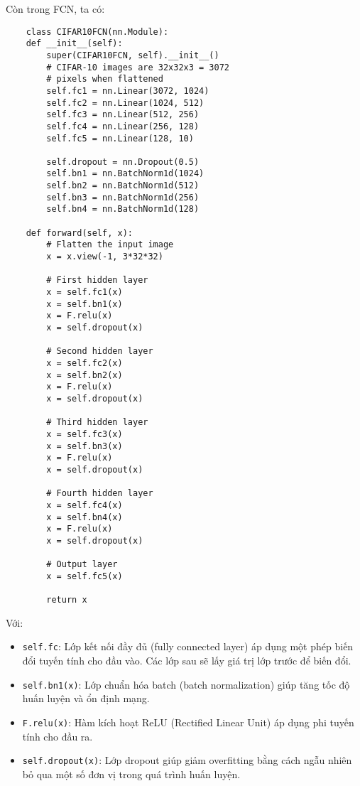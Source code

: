 \documentclass[../main.tex]{subfiles}
\begin{document}
Còn trong FCN, ta có:

\begin{verbatim}
    class CIFAR10FCN(nn.Module):
    def __init__(self):
        super(CIFAR10FCN, self).__init__()
        # CIFAR-10 images are 32x32x3 = 3072 
        # pixels when flattened
        self.fc1 = nn.Linear(3072, 1024)
        self.fc2 = nn.Linear(1024, 512)
        self.fc3 = nn.Linear(512, 256)
        self.fc4 = nn.Linear(256, 128)
        self.fc5 = nn.Linear(128, 10)
        
        self.dropout = nn.Dropout(0.5)
        self.bn1 = nn.BatchNorm1d(1024)
        self.bn2 = nn.BatchNorm1d(512)
        self.bn3 = nn.BatchNorm1d(256)
        self.bn4 = nn.BatchNorm1d(128)

    def forward(self, x):
        # Flatten the input image
        x = x.view(-1, 3*32*32)
        
        # First hidden layer
        x = self.fc1(x)
        x = self.bn1(x)
        x = F.relu(x)
        x = self.dropout(x)
        
        # Second hidden layer
        x = self.fc2(x)
        x = self.bn2(x)
        x = F.relu(x)
        x = self.dropout(x)
        
        # Third hidden layer
        x = self.fc3(x)
        x = self.bn3(x)
        x = F.relu(x)
        x = self.dropout(x)
        
        # Fourth hidden layer
        x = self.fc4(x)
        x = self.bn4(x)
        x = F.relu(x)
        x = self.dropout(x)
        
        # Output layer
        x = self.fc5(x)
        
        return x
\end{verbatim}

Với:

\begin{itemize}
    \item \verb|self.fc|: Lớp kết nối đầy đủ (fully connected layer) áp dụng một phép biến đổi tuyến tính cho đầu vào. Các lớp sau sẽ lấy giá trị lớp trước để biến đổi.
    \item \verb|self.bn1(x)|: Lớp chuẩn hóa batch (batch normalization) giúp tăng tốc độ huấn luyện và ổn định mạng.
    \item \verb|F.relu(x)|: Hàm kích hoạt ReLU (Rectified Linear Unit) áp dụng phi tuyến tính cho đầu ra.
    \item \verb|self.dropout(x)|: Lớp dropout giúp giảm overfitting bằng cách ngẫu nhiên bỏ qua một số đơn vị trong quá trình huấn luyện.
\end{itemize}
\end{document}
